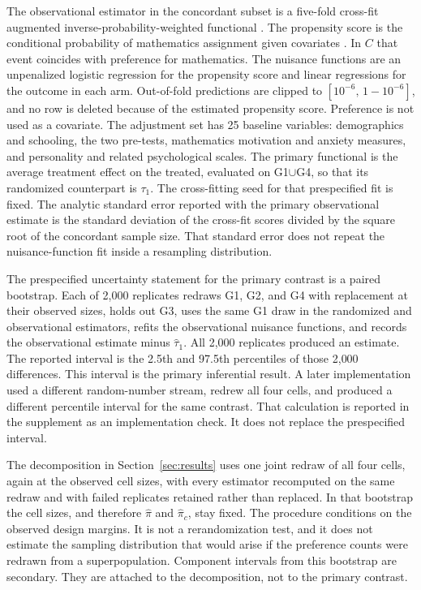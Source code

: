 \documentclass[11pt]{article}
\theoremstyle{remark}
\begin{document}
The observational estimator in the concordant subset is a five-fold cross-fit augmented inverse-probability-weighted functional \citep{bang2005,chernozhukov2018}. The propensity score is the conditional probability of mathematics assignment given covariates \citep{rosenbaum1983}. In $C$ that event coincides with preference for mathematics. The nuisance functions are an unpenalized logistic regression for the propensity score and linear regressions for the outcome in each arm. Out-of-fold predictions are clipped to $[10^{-6},\,1-10^{-6}]$, and no row is deleted because of the estimated propensity score. Preference is not used as a covariate. The adjustment set has 25 baseline variables: demographics and schooling, the two pre-tests, mathematics motivation and anxiety measures, and personality and related psychological scales. The primary functional is the average treatment effect on the treated, evaluated on G1$\cup$G4, so that its randomized counterpart is $\tau_1$. The cross-fitting seed for that prespecified fit is fixed. The analytic standard error reported with the primary observational estimate is the standard deviation of the cross-fit scores divided by the square root of the concordant sample size. That standard error does not repeat the nuisance-function fit inside a resampling distribution.

The prespecified uncertainty statement for the primary contrast is a paired bootstrap. Each of 2{,}000 replicates redraws G1, G2, and G4 with replacement at their observed sizes, holds out G3, uses the same G1 draw in the randomized and observational estimators, refits the observational nuisance functions, and records the observational estimate minus $\widehat\tau_1$. All 2{,}000 replicates produced an estimate. The reported interval is the 2.5th and 97.5th percentiles of those 2{,}000 differences. This interval is the primary inferential result. A later implementation used a different random-number stream, redrew all four cells, and produced a different percentile interval for the same contrast. That calculation is reported in the supplement as an implementation check. It does not replace the prespecified interval.

The decomposition in Section~\ref{sec:results} uses one joint redraw of all four cells, again at the observed cell sizes, with every estimator recomputed on the same redraw and with failed replicates retained rather than replaced. In that bootstrap the cell sizes, and therefore $\widehat\pi$ and $\widehat\pi_c$, stay fixed. The procedure conditions on the observed design margins. It is not a rerandomization test, and it does not estimate the sampling distribution that would arise if the preference counts were redrawn from a superpopulation. Component intervals from this bootstrap are secondary. They are attached to the decomposition, not to the primary contrast.
\end{document}
